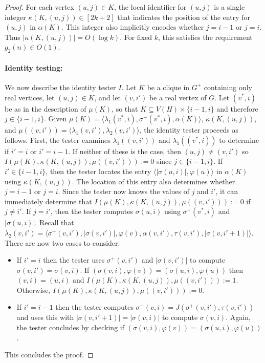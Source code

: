 \documentclass[twoside,leqno]{article}
\newcommand{\Oh}{O}
\begin{document}
\begin{proof}
    For each vertex $(u,j)\in K$, the local identifier for $(u,j)$ is a single integer $\kappa(K,(u,j))\in[2k+2]$ that indicates the position of the entry for $(u,j)$ in $\alpha(K)$.  This integer also implicitly encodes whether $j=i-1$  or $j=i$.  Thus $|\kappa(K,(u,j))| = \Oh(\log k)$.  For fixed $k$, this satisfies the requirement $g_2(n)\in\Oh(1)$.

    \paragraph{Identity testing:}

    We now describe the identity tester $I$.  Let $K$ be a clique in $G^+$ containing only real vertices, let $(u,j)\in K$, and let $(v,i')$ be a real vertex of $G$.  Let $(v^*,i)$ be as in the description of $\mu(K)$, so that $K\subseteq V(H)\times\{i-1,i\}$ and therefore $j\in\{i-1,i\}$.   Given $\mu(K)=\langle\lambda_1(v^*,i),\sigma^+(v^*,i),\alpha(K)\rangle$, $\kappa(K,(u,j))$, and $\mu((v,i'))=\langle \lambda_1(v,i'),\lambda_2(v,i')\rangle$, the identity tester proceeds as follows. First, the tester examines $\lambda_1((v,i'))$ and $\lambda_1((v^*,i))$ to determine if $i'=i$ or $i'=i-1$.  If neither of these is the case, then $(u,j)\neq (v,i')$ so $I(\mu(K),\kappa(K,(u,j)),\mu((v,i'))):=0$ since $j\in\{i-1,i\}$.
    If $i'\in\{i-1,i\}$, then the tester locates the entry $\langle |\sigma(u,i)|,\varphi(u)\rangle$ in $\alpha(K)$ using $\kappa(K,(u,j))$. The location of this entry also determines whether $j=i-1$ or $j=i$.  Since the tester now knows the values of $j$ and $i'$, it can immediately determine that $I(\mu(K),\kappa(K,(u,j)),\mu((v,i'))):=0$ if $j\neq i'$.
    If $j=i'$, then the tester computes $\sigma(u,i)$ using $\sigma^+(v^*,i)$ and $|\sigma(u,i)|$. Recall that $\lambda_2(v,i')=\langle \sigma^+(v,i'), |\sigma(v,i')|, \varphi(v),\alpha(v,i'),\tau(v,i'),|\sigma(v,i'+1)|\rangle$.
  There are now two cases to consider:
  \begin{itemize}
    \item If $i'=i$ then the tester uses $\sigma^+(v,i')$ and $|\sigma(v,i')|$ to compute $\sigma(v,i')=\sigma(v,i)$.  If $(\sigma(v,i),\varphi(v))=(\sigma(u,i),\varphi(u))$ then $(v,i)=(u,i)$ and  $I(\mu(K),\kappa(K,(u,j)),\mu((v,i'))):=1$.  Otherwise, $I(\mu(K),\kappa(K,(u,j)),\mu((v,i'))):=0$.
    \item If $i'=i-1$ then the tester computes $\sigma^+(v,i)=J(\sigma^+(v,i'),\tau(v,i'))$ and uses this with $|\sigma(v,i'+1)|=|\sigma(v,i)|$ to compute $\sigma(v,i)$.  Again, the tester concludes by checking if $(\sigma(v,i),\varphi(v))=(\sigma(u,i),\varphi(u))$.
  \end{itemize}
  This concludes the proof.
\end{proof}

\end{document}
